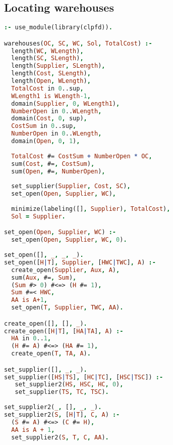 \subsection{Locating warehouses}
\label{implementation:sicstus:warehouses}
\begin{lstlisting}[language=Prolog]
:- use_module(library(clpfd)).

warehouses(OC, SC, WC, Sol, TotalCost) :-
  length(WC, WLength),
  length(SC, SLength),
  length(Supplier, SLength),
  length(Cost, SLength),
  length(Open, WLength),
  TotalCost in 0..sup,
  WLength1 is WLength-1,
  domain(Supplier, 0, WLength1),
  NumberOpen in 0..WLength,
  domain(Cost, 0, sup),
  CostSum in 0..sup,
  NumberOpen in 0..WLength,
  domain(Open, 0, 1),
  
  TotalCost #= CostSum + NumberOpen * OC,
  sum(Cost, #=, CostSum),
  sum(Open, #=, NumberOpen),
  
  set_supplier(Supplier, Cost, SC),
  set_open(Open, Supplier, WC),
  
  minimize(labeling([], Supplier), TotalCost),
  Sol = Supplier.

set_open(Open, Supplier, WC) :-
  set_open(Open, Supplier, WC, 0).
  
set_open([], _, _, _).
set_open([H|T], Supplier, [HWC|TWC], A) :-
  create_open(Supplier, Aux, A),
  sum(Aux, #=, Sum),
  (Sum #> 0) #<=> (H #= 1),
  Sum #=< HWC,
  AA is A+1,
  set_open(T, Supplier, TWC, AA).

create_open([], [], _).
create_open([H|T], [HA|TA], A) :-
  HA in 0..1,
  (H #= A) #<=> (HA #= 1),
  create_open(T, TA, A).

set_supplier([], _, _).
set_supplier([HS|TS], [HC|TC], [HSC|TSC]) :-
   set_supplier2(HS, HSC, HC, 0),
   set_supplier(TS, TC, TSC).
   
set_supplier2(_, [], _, _).
set_supplier2(S, [H|T], C, A) :-
  (S #= A) #<=> (C #= H),
  AA is A + 1,
  set_supplier2(S, T, C, AA).
\end{lstlisting}